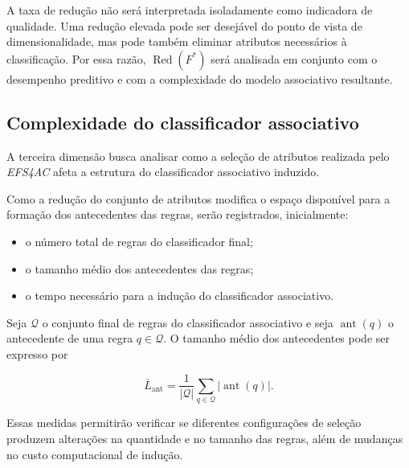 A taxa de redução não será interpretada isoladamente como indicadora de
qualidade. Uma redução elevada pode ser desejável do ponto de vista de
dimensionalidade, mas pode também eliminar atributos necessários à
classificação. Por essa razão, $\operatorname{Red}(F^{*})$ será analisada em
conjunto com o desempenho preditivo e com a complexidade do modelo associativo
resultante.


\subsection{Complexidade do classificador associativo}
\label{subsec:ac-efs-avaliacao-complexidade}

A terceira dimensão busca analisar como a seleção de atributos realizada pelo
\textit{EFS4AC} afeta a estrutura do classificador associativo induzido.

Como a redução do conjunto de atributos modifica o espaço disponível para a
formação dos antecedentes das regras, serão registrados, inicialmente:

\begin{itemize}

    \item o número total de regras do classificador final;

    \item o tamanho médio dos antecedentes das regras;

    \item o tempo necessário para a indução do classificador associativo.

\end{itemize}

Seja $\mathcal{Q}$ o conjunto final de regras do classificador associativo e
seja $\operatorname{ant}(q)$ o antecedente de uma regra $q\in\mathcal{Q}$.
O tamanho médio dos antecedentes pode ser expresso por

\begin{equation}
    \overline{L}_{\mathrm{ant}}
    =
    \frac{1}{|\mathcal{Q}|}
    \sum_{q\in\mathcal{Q}}
    |\operatorname{ant}(q)|.
    \label{eq:tamanho-medio-regras-ac-efs}
\end{equation}

Essas medidas permitirão verificar se diferentes configurações de seleção
produzem alterações na quantidade e no tamanho das regras, além de mudanças no
custo computacional de indução.

